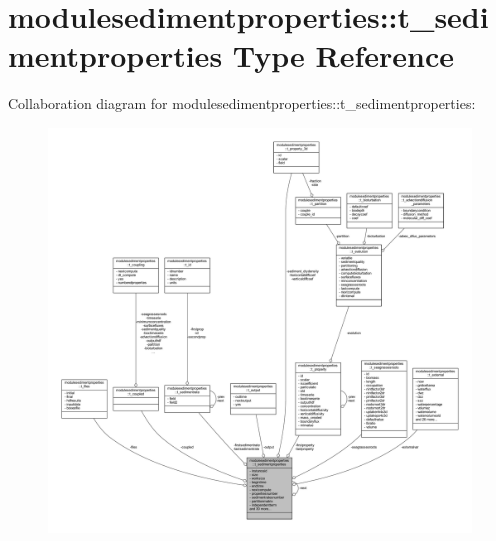 \hypertarget{structmodulesedimentproperties_1_1t__sedimentproperties}{}\section{modulesedimentproperties\+:\+:t\+\_\+sedimentproperties Type Reference}
\label{structmodulesedimentproperties_1_1t__sedimentproperties}


Collaboration diagram for modulesedimentproperties\+:\+:t\+\_\+sedimentproperties\+:\nopagebreak
\begin{figure}[H]
\begin{center}
\leavevmode
\includegraphics[width=350pt]{structmodulesedimentproperties_1_1t__sedimentproperties__coll__graph}
\end{center}
\end{figure}
